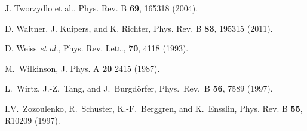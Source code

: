 \documentclass[a4paper,10pt]{article}
\begin{document}
\begin{thebibliography}{Cucc~02b}
J. Tworzydlo et al., Phys. Rev. B {\bf 69}, 165318 (2004).

D. Waltner, J. Kuipers, and K. Richter, Phys. Rev. B {\bf 83}, 195315 (2011).

D. Weiss {\em et al.}, Phys. Rev. Lett., {\bf 70}, 4118 (1993).

M.~Wilkinson, J. Phys. A {\bf 20} 2415 (1987).

L.~Wirtz, J.-Z.~Tang, and J.~Burgd\"orfer, 
Phys.\ Rev.\ B {\bf 56}, 7589 (1997).

I.V.~Zozoulenko, R.~Schuster, K.-F.~Berggren, and 
K.~Ensslin, Phys. Rev. B {\bf 55}, R10209 (1997).

\end{thebibliography}

\end{document}
